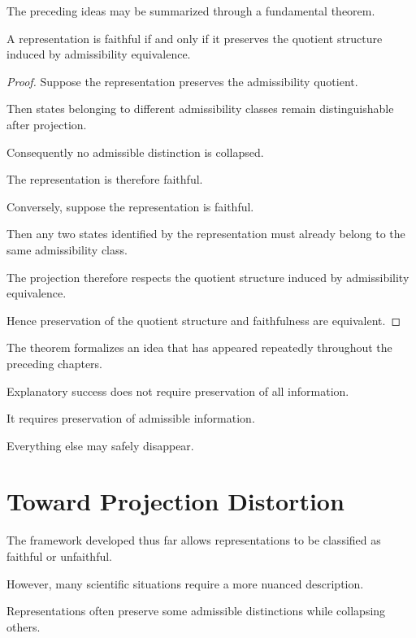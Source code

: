 \documentclass[11pt,oneside,openany]{book}
\begin{document}
The preceding ideas may be summarized through a fundamental theorem.

\begin{theorem}

A representation is faithful if and only if it preserves the quotient structure induced by admissibility equivalence.

\end{theorem}

\begin{proof}

Suppose the representation preserves the admissibility quotient.

Then states belonging to different admissibility classes remain distinguishable after projection.

Consequently no admissible distinction is collapsed.

The representation is therefore faithful.

Conversely, suppose the representation is faithful.

Then any two states identified by the representation must already belong to the same admissibility class.

The projection therefore respects the quotient structure induced by admissibility equivalence.

Hence preservation of the quotient structure and faithfulness are equivalent.

\end{proof}

The theorem formalizes an idea that has appeared repeatedly throughout the preceding chapters.

Explanatory success does not require preservation of all information.

It requires preservation of admissible information.

Everything else may safely disappear.

\section{Toward Projection Distortion}

The framework developed thus far allows representations to be classified as faithful or unfaithful.

However, many scientific situations require a more nuanced description.

Representations often preserve some admissible distinctions while collapsing others.
\end{document}
